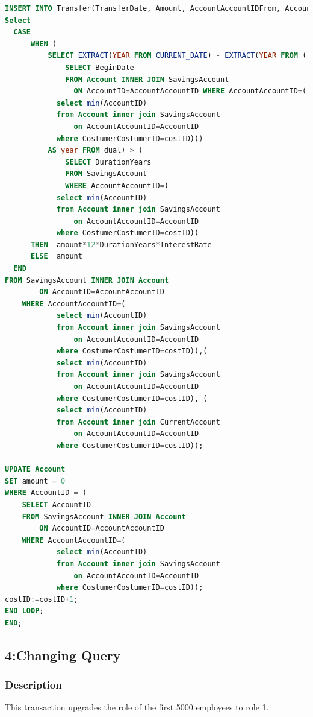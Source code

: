 \documentclass[a4paper, 10pt]{article}
\begin{document}
\begin{lstlisting}[language=SQL]
INSERT INTO Transfer(TransferDate, Amount, AccountAccountIDFrom, AccountAccountIDTo) VALUES (CURRENT_DATE, (
Select
  CASE
      WHEN (
          SELECT EXTRACT(YEAR FROM CURRENT_DATE) - EXTRACT(YEAR FROM (
              SELECT BeginDate 
              FROM Account INNER JOIN SavingsAccount 
                ON AccountID=AccountAccountID WHERE AccountAccountID=(
            select min(AccountID) 
            from Account inner join SavingsAccount 
                on AccountAccountID=AccountID 
            where CostumerCostumerID=costID))) 
          AS year FROM dual) > (
              SELECT DurationYears 
              FROM SavingsAccount 
              WHERE AccountAccountID=(
            select min(AccountID) 
            from Account inner join SavingsAccount 
                on AccountAccountID=AccountID 
            where CostumerCostumerID=costID))
      THEN  amount*12*DurationYears*InterestRate
      ELSE  amount
  END
FROM SavingsAccount INNER JOIN Account
        ON AccountID=AccountAccountID
    WHERE AccountAccountID=(
            select min(AccountID) 
            from Account inner join SavingsAccount 
                on AccountAccountID=AccountID 
            where CostumerCostumerID=costID)),(
            select min(AccountID) 
            from Account inner join SavingsAccount 
                on AccountAccountID=AccountID 
            where CostumerCostumerID=costID), (
            select min(AccountID) 
            from Account inner join CurrentAccount 
                on AccountAccountID=AccountID 
            where CostumerCostumerID=costID));

UPDATE Account
SET amount = 0
WHERE AccountID = (
    SELECT AccountID 
    FROM SavingsAccount INNER JOIN Account 
        ON AccountID=AccountAccountID 
    WHERE AccountAccountID=(
            select min(AccountID) 
            from Account inner join SavingsAccount 
                on AccountAccountID=AccountID 
            where CostumerCostumerID=costID));
costID:=costID+1;
END LOOP;
END;

\end{lstlisting}

\subsection{4:Changing Query}
\subsubsection{Description}
This transaction upgrades the role of the first 5000 employees to role 1.
\end{document}
